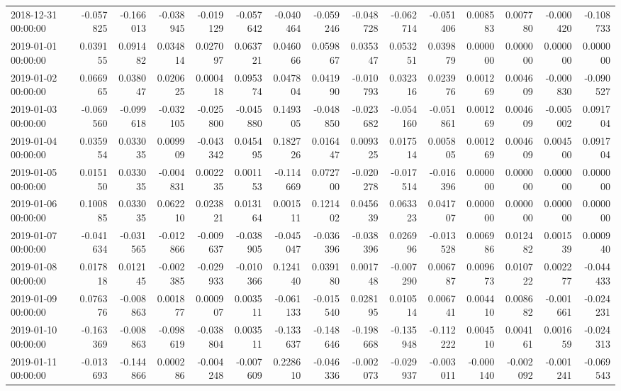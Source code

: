 \begin{tabular}{lrrrrrrrrrrrrrr}
2018-12-31 00:00:00 & -0.057825 & -0.166013 & -0.038945 & -0.019129 & -0.057642 & -0.040464 & -0.059246 & -0.048728 & -0.062714 & -0.051406 & 0.008583 & 0.007780 & -0.000420 & -0.108733 \\
2019-01-01 00:00:00 & 0.039155 & 0.091482 & 0.034814 & 0.027097 & 0.063721 & 0.046066 & 0.059867 & 0.035347 & 0.053251 & 0.039879 & 0.000000 & 0.000000 & 0.000000 & 0.000000 \\
2019-01-02 00:00:00 & 0.066965 & 0.038047 & 0.020625 & 0.000418 & 0.095374 & 0.047804 & 0.041990 & -0.010793 & 0.032316 & 0.023976 & 0.001269 & 0.004609 & -0.000830 & -0.090527 \\
2019-01-03 00:00:00 & -0.069560 & -0.099618 & -0.032105 & -0.025800 & -0.045880 & 0.149305 & -0.048850 & -0.023682 & -0.054160 & -0.051861 & 0.001269 & 0.004609 & -0.005002 & 0.091704 \\
2019-01-04 00:00:00 & 0.035954 & 0.033035 & 0.009909 & -0.043342 & 0.045495 & 0.182726 & 0.016447 & 0.009325 & 0.017514 & 0.005805 & 0.001269 & 0.004609 & 0.004500 & 0.091704 \\
2019-01-05 00:00:00 & 0.015150 & 0.033035 & -0.004831 & 0.002235 & 0.001153 & -0.114669 & 0.072700 & -0.020278 & -0.017514 & -0.016396 & 0.000000 & 0.000000 & 0.000000 & 0.000000 \\
2019-01-06 00:00:00 & 0.100885 & 0.033035 & 0.062210 & 0.023821 & 0.013164 & 0.001511 & 0.121402 & 0.045639 & 0.063323 & 0.041707 & 0.000000 & 0.000000 & 0.000000 & 0.000000 \\
2019-01-07 00:00:00 & -0.041634 & -0.031565 & -0.012866 & -0.009637 & -0.038905 & -0.045047 & -0.036396 & -0.038396 & 0.026996 & -0.013528 & 0.006986 & 0.012482 & 0.001539 & 0.000940 \\
2019-01-08 00:00:00 & 0.017818 & 0.012145 & -0.002385 & -0.029933 & -0.010366 & 0.124140 & 0.039180 & 0.001748 & -0.007290 & 0.006787 & 0.009673 & 0.010722 & 0.002277 & -0.044433 \\
2019-01-09 00:00:00 & 0.076376 & -0.008863 & 0.001877 & 0.000907 & 0.003511 & -0.061133 & -0.015540 & 0.028195 & 0.010514 & 0.006741 & 0.004410 & 0.008682 & -0.001661 & -0.024231 \\
2019-01-10 00:00:00 & -0.163369 & -0.008863 & -0.098619 & -0.038804 & 0.003511 & -0.133637 & -0.148646 & -0.198668 & -0.135948 & -0.112222 & 0.004510 & 0.004161 & 0.001659 & -0.024313 \\
2019-01-11 00:00:00 & -0.013693 & -0.144866 & 0.000286 & -0.004248 & -0.007609 & 0.228610 & -0.046336 & -0.002073 & -0.029937 & -0.003011 & -0.000140 & -0.002092 & -0.001241 & -0.069543 \\

\end{tabular}
